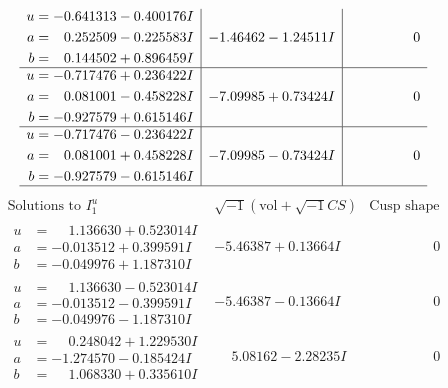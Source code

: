 \documentclass[1p]{elsarticle_modified}
\theoremstyle{definition}
\newcommand{\I}{\sqrt{-1}}
\begin{document}
$$\begin{array}{c|c|c}
\begin{aligned}
u &= -0.641313 - 0.400176 I \\
a &= \phantom{-}0.252509 - 0.225583 I \\
b &= \phantom{-}0.144502 + 0.896459 I\end{aligned}
 & -1.46462 - 1.24511 I & \phantom{-0.000000 } 0 \\ \hline\begin{aligned}
u &= -0.717476 + 0.236422 I \\
a &= \phantom{-}0.081001 - 0.458228 I \\
b &= -0.927579 + 0.615146 I\end{aligned}
 & -7.09985 + 0.73424 I & \phantom{-0.000000 } 0 \\ \hline\begin{aligned}
u &= -0.717476 - 0.236422 I \\
a &= \phantom{-}0.081001 + 0.458228 I \\
b &= -0.927579 - 0.615146 I\end{aligned}
 & -7.09985 - 0.73424 I & \phantom{-0.000000 } 0\\
 \hline 
 \end{array}$$\newpage$$\begin{array}{c|c|c}  
\text{Solutions to }I^u_{1}& \I (\text{vol} + \sqrt{-1}CS) & \text{Cusp shape}\\
 \hline 
\begin{aligned}
u &= \phantom{-}1.136630 + 0.523014 I \\
a &= -0.013512 + 0.399591 I \\
b &= -0.049976 + 1.187310 I\end{aligned}
 & -5.46387 + 0.13664 I & \phantom{-0.000000 } 0 \\ \hline\begin{aligned}
u &= \phantom{-}1.136630 - 0.523014 I \\
a &= -0.013512 - 0.399591 I \\
b &= -0.049976 - 1.187310 I\end{aligned}
 & -5.46387 - 0.13664 I & \phantom{-0.000000 } 0 \\ \hline\begin{aligned}
u &= \phantom{-}0.248042 + 1.229530 I \\
a &= -1.274570 - 0.185424 I \\
b &= \phantom{-}1.068330 + 0.335610 I\end{aligned}
 & \phantom{-}5.08162 - 2.28235 I & \phantom{-0.000000 } 0 \\ \hline\begin{aligned}

\end{aligned}
\end{array}$$
\end{document}
